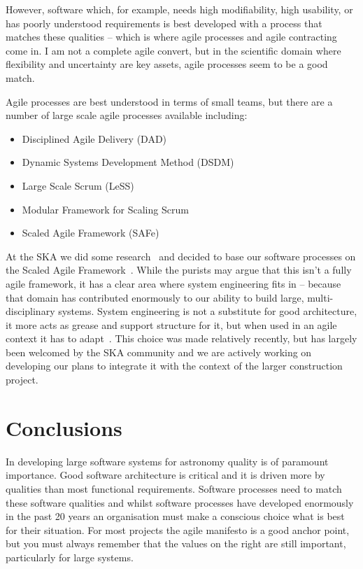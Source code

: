 \documentclass[11pt,twoside]{article}
\begin{document}
However, software which, for example, needs high modifiability, high usability, or 
has poorly understood requirements is best developed with a process that matches these 
qualities -- which is where agile processes and agile contracting come in. I am not a 
complete agile convert, but in the scientific domain where flexibility and uncertainty 
are key assets, agile processes seem to be a good match. 

Agile processes are best understood in terms of small teams, but there are a number 
of large scale agile processes available including:

\begin{itemize}
	\item Disciplined Agile Delivery (DAD) 
	\item Dynamic Systems Development Method (DSDM) 
	\item Large Scale Scrum (LeSS) 
	\item Modular Framework for Scaling Scrum 
	\item Scaled Agile Framework (SAFe) 
\end{itemize}

At the SKA we did some research~\citep[see, for example,][]{hayes2016,clarke2017} and decided to base our software processes on the Scaled Agile Framework~\citep{safe2017}. While the purists may argue that this isn't a fully agile 
framework, it has a clear area where system engineering fits in -- because that domain 
has contributed enormously to our ability to build large, multi-disciplinary systems. 
System engineering is not a substitute for good architecture, it more acts as grease and 
support structure for it, but when used in an agile context it has to adapt~\citep{O4-4_adassxxvii}. This choice was made relatively recently, but has largely been welcomed 
by the SKA community and we are actively working on developing our plans to integrate 
it with the context of the larger construction project. 


\section{Conclusions} %
\label{sec:conclusions}
In developing large software systems for astronomy quality is of paramount importance. 
Good software architecture is critical and it is driven more by qualities than most 
functional requirements. Software processes need to match these software qualities and 
whilst software processes have developed enormously in the past 20 years an organisation 
must make a conscious choice what is best for their situation. For most projects the 
agile manifesto is a good anchor point, but you must always remember that the values 
on the right are still important, particularly for large systems. 
\end{document}
